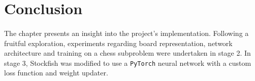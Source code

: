 \documentclass[12pt,a4paper]{book}
\begin{document}



\section{Conclusion}

\paragraph{} The chapter presents an insight into the project's implementation. Following a fruitful exploration, experiments regarding board representation, network architecture and training on a chess subproblem were undertaken in stage 2. In stage 3, Stockfish was modified to use a \texttt{PyTorch} neural network with a custom loss function and weight updater.

\end{document}
